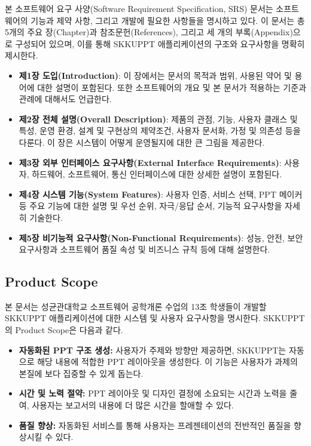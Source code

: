 \documentclass[a4paper, 12pt]{article}
\begin{document}
본 소프트웨어 요구 사양(Software Requirement Specification, SRS) 문서는 소프트웨어의 기능과 제약 사항, 그리고 개발에 필요한 사항들을 명시하고 있다. 이 문서는 총 5개의 주요 장(Chapter)과 참조문헌(References), 그리고 세 개의 부록(Appendix)으로 구성되어 있으며, 이를 통해 SKKUPPT 애플리케이션의 구조와 요구사항을 명확히 제시한다.

\begin{itemize}
\item \textbf{제1장 도입(Introduction)}: 이 장에서는 문서의 목적과 범위, 사용된 약어 및 용어에 대한 설명이 포함된다. 또한 소프트웨어의 개요 및 본 문서가 적용하는 기준과 관례에 대해서도 언급한다.

\item \textbf{제2장 전체 설명(Overall Description)}: 제품의 관점, 기능, 사용자 클래스 및 특성, 운영 환경, 설계 및 구현상의 제약조건, 사용자 문서화, 가정 및 의존성 등을 다룬다. 이 장은 시스템이 어떻게 운영될지에 대한 큰 그림을 제공한다.

\item \textbf{제3장 외부 인터페이스 요구사항(External Interface Requirements)}: 사용자, 하드웨어, 소프트웨어, 통신 인터페이스에 대한 상세한 설명이 포함된다.

\item \textbf{제4장 시스템 기능(System Features)}: 사용자 인증, 서비스 선택, PPT 메이커 등 주요 기능에 대한 설명 및 우선 순위, 자극/응답 순서, 기능적 요구사항을 자세히 기술한다.

\item \textbf{제5장 비기능적 요구사항(Non-Functional Requirements)}: 성능, 안전, 보안 요구사항과 소프트웨어 품질 속성 및 비즈니스 규칙 등에 대해 설명한다.
\end{itemize}
\subsection{Product Scope}
본 문서는 성균관대학교 소프트웨어 공학개론 수업의 13조 학생들이 개발할 SKKUPPT 애플리케이션에 대한 시스템 및 사용자 요구사항을 명시한다. SKKUPPT의 Product Scope은 다음과 같다. 

\begin{itemize}
  \item \textbf{자동화된 PPT 구조 생성:} 사용자가 주제와 방향만 제공하면, SKKUPPT는 자동으로 해당 내용에 적합한 PPT 레이아웃을 생성한다. 이 기능은 사용자가 과제의 본질에 보다 집중할 수 있게 돕는다.
  \item \textbf{시간 및 노력 절약:} PPT 레이아웃 및 디자인 결정에 소요되는 시간과 노력을 줄여, 사용자는 보고서의 내용에 더 많은 시간을 할애할 수 있다.
  \item \textbf{품질 향상:} 자동화된 서비스를 통해 사용자는 프레젠테이션의 전반적인 품질을 향상시킬 수 있다.
\end{itemize}
\end{document}
